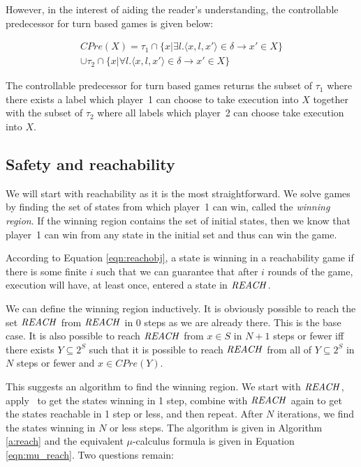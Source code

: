 However, in the interest of aiding the reader's understanding, the controllable predecessor for turn based games is given below:

\begin{multline}
CPre(X) = \tau_1 \cap \{x | \exists l. \langle x, l, x' \rangle \in \delta \rightarrow x' \in X\} \\ \cup \tau_2 \cap \{x | \forall l. \langle x, l, x' \rangle \in \delta \rightarrow x' \in X \}
\end{multline}

The controllable predecessor for turn based games returns the subset of $\tau_1$ where there exists a label which player~1 can choose to take execution into $X$ together with the subset of $\tau_2$ where all labels which player~2 can choose take execution into $X$. 

\subsection{Safety and reachability}

We will start with reachability as it is the most straightforward. We solve games by finding the set of states from which player~1 can win, called the \emph{winning region}. If the winning region contains the set of initial states, then we know that player~1 can win from any state in the initial set and thus can win the game.

According to Equation \ref{eqn:reachobj}, a state is winning in a reachability game if there is some finite $i$ such that we can guarantee that after $i$ rounds of the game, execution will have, at least once, entered a state in $\mathit{REACH}$. 

We can define the winning region inductively. It is obviously possible to reach the set $\mathit{REACH}$ from $\mathit{REACH}$ in 0 steps as we are already there. This is the base case. It is also possible to reach $\mathit{REACH}$ from $x \in S$ in $N + 1$ steps or fewer iff there exists $Y\subseteq 2^S$ such that it is possible to reach $\mathit{REACH}$ from all of $Y \subseteq 2^S$ in $N$ steps or fewer and $x \in CPre(Y)$.

This suggests an algorithm to find the winning region. We start with $\mathit{REACH}$, apply \cpre\ to get the states winning in 1 step, combine with $\mathit{REACH}$ again to get the states reachable in 1 step or less, and then repeat. After $N$ iterations, we find the states winning in $N$ or less steps. The algorithm is given in Algorithm \ref{a:reach} and the equivalent $\mu$-calculus formula is given in Equation \ref{eqn:mu_reach}. Two questions remain: 

